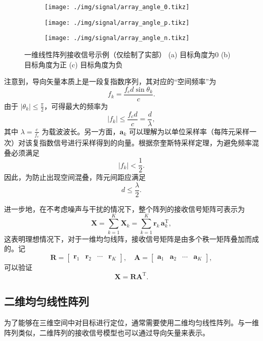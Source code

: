 \begin{figure}[htb!]
    \centering
    \begin{subfigure}{.23\textwidth}
        \centering
        \texttt{[image: ./img/signal/array\_angle\_0.tikz]}
        \caption{}
        \label{fig_array_angle_1}
    \end{subfigure}
    \begin{subfigure}{.23\textwidth}
        \centering
        \texttt{[image: ./img/signal/array\_angle\_p.tikz]}
        \caption{}
        \label{fig_array_angle_2}
    \end{subfigure}
    \begin{subfigure}{.23\textwidth}
        \centering
        \texttt{[image: ./img/signal/array\_angle\_n.tikz]}
        \caption{}
        \label{fig_array_angle_3}
    \end{subfigure}
    \caption{一维线性阵列接收信号示例（仅绘制了实部） (a) 目标角度为0 (b) 目标角度为正 (c) 目标角度为负}
    \label{fig_array_angle}
\end{figure}

注意到，导向矢量本质上是一段复指数序列，其对应的``空间频率''为
\[
    f_k = \frac{f_c d \sin\theta_k}{c}.
\]
由于 \( |\theta_k| \leq \tfrac{\pi}{2} \)，可得最大的频率为
\[
    |f_k| \leq \frac{f_c d}{c} = \frac{d}{\lambda},
\]
其中 \(\lambda = \tfrac{c}{f_c}\) 为载波波长。另一方面，\(\bm{a}_k\) 可以理解为以单位采样率（每阵元采样一次）对该复指数信号进行采样得到的向量。根据奈奎斯特采样定理，为避免频率混叠必须满足
\[
    |f_k| < \frac{1}{2}.
\]
因此，为防止出现空间混叠，阵元间距应满足
\[
    d \leq \frac{\lambda}{2}.
\]


进一步地，在不考虑噪声与干扰的情况下，整个阵列的接收信号矩阵可表示为
\[
    \mathbf{X}
    = \sum_{k=1}^{K} \mathbf{X}_k
    = \sum_{k=1}^{K} \bm{r}_k \, \bm{a}_k^{\mathrm{T}},
\]
这表明理想情况下，对于一维均匀线阵，接收信号矩阵是由多个秩一矩阵叠加而成的。记
\[
    \mathbf{R} = \begin{bmatrix}
        \bm{r}_1 & \bm{r}_2 & \cdots & \bm{r}_K
    \end{bmatrix}, \quad \mathbf{A} = \begin{bmatrix}
        \bm{a}_1 & \bm{a}_2 & \cdots & \bm{a}_K
    \end{bmatrix},
\]
可以验证
\[
    \mathbf{X} = \mathbf{R} \mathbf{A}^{\mathrm{T}}.
\]

\subsection{二维均匀线性阵列}
为了能够在三维空间中对目标进行定位，通常需要使用二维均匀线性阵列。与一维阵列类似，二维阵列的接收信号模型也可以通过导向矢量来表示。

